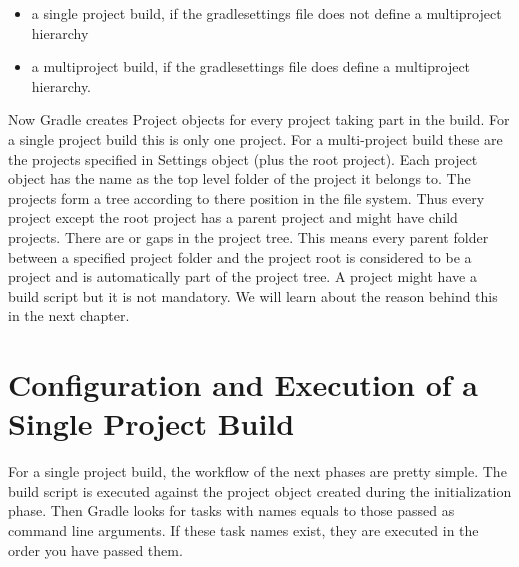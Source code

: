 \begin{itemize}
	\item a single project build, if the gradlesettings file does not define a multiproject hierarchy
    \item a multiproject build, if the gradlesettings file does define a multiproject hierarchy.
\end{itemize}
Now Gradle creates Project objects for every project taking part in the build. For a single project build this is only one project. For a multi-project build these are the projects specified in Settings object (plus the root project). Each project object has the name as the top level folder of the project it belongs to. The projects form a tree according to there position in the file system. Thus every project except the root project has a parent project and might have child projects. There are or gaps in the project tree. This means every parent folder between a specified project folder and the project root is considered to be a project and is automatically part of the project tree. A project might have a build script but it is not mandatory. We will learn about the reason behind this in the next chapter.
\section{Configuration and Execution of a Single Project Build} %
\label{sec:configuration_and_execution_of_a_single_project_build}

For a single project build, the workflow of the next phases are pretty simple. The build script is executed against the project object created during the initialization phase. Then Gradle looks for tasks with names equals to those passed as command line arguments. If these task names exist, they are executed in the order you have passed them.


